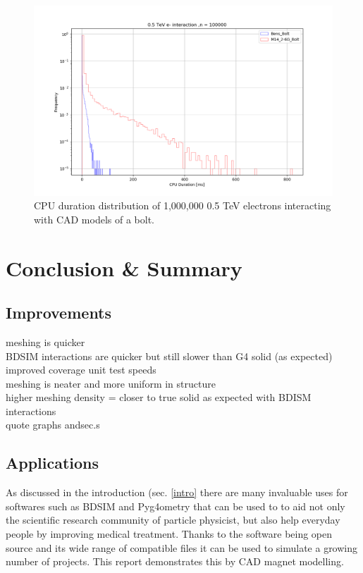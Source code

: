 \documentclass[12pt,a4paper]{article}
\begin{document}
\begin{figure}[h!]
\centering
\includegraphics[scale=0.5]{Images//CAD_Screw//cpudist1.png}
\caption[width=\columnwidth]{CPU duration distribution of 1,000,000 0.5 TeV electrons interacting with CAD models of a bolt.}
\label{brgqebafd}
\end{figure}


\newpage
\section{Conclusion \& Summary}
\label{conc}

\subsection{Improvements}
meshing is quicker\\
BDSIM interactions are quicker but still slower than G4 solid (as expected)
improved coverage unit test speeds\\
meshing is neater and more uniform in structure\\
higher meshing density = closer to true solid as expected with BDISM interactions\\
quote graphs andsec.s\\

\subsection{Applications}
As discussed in the introduction (sec. \ref{intro} there are many invaluable uses for softwares such as BDSIM and Pyg4ometry that can be used to to aid not only the scientific research community of particle physicist, but also help everyday people by improving medical treatment. Thanks to the software being open source and its wide range of compatible files it can be used to simulate a growing number of projects. This report demonstrates this by CAD magnet modelling.
\end{document}
